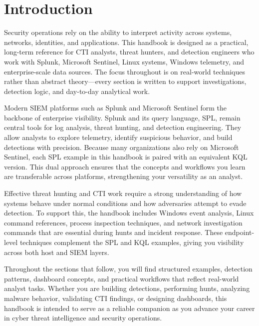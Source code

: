 \section{Introduction}

Security operations rely on the ability to interpret activity across systems, networks, identities, and applications. 
This handbook is designed as a practical, long-term reference for CTI analysts, threat hunters, and detection engineers 
who work with Splunk, Microsoft Sentinel, Linux systems, Windows telemetry, and enterprise-scale data sources. 
The focus throughout is on real-world techniques rather than abstract theory—every section is written to support 
investigations, detection logic, and day-to-day analytical work.

Modern SIEM platforms such as Splunk and Microsoft Sentinel form the backbone of enterprise visibility. 
Splunk and its query language, SPL, remain central tools for log analysis, threat hunting, and detection engineering. 
They allow analysts to explore telemetry, identify suspicious behavior, and build detections with precision. 
Because many organizations also rely on Microsoft Sentinel, each SPL example in this handbook is paired with an 
equivalent KQL version. This dual approach ensures that the concepts and workflows you learn are transferable 
across platforms, strengthening your versatility as an analyst.

Effective threat hunting and CTI work require a strong understanding of how systems behave under normal conditions 
and how adversaries attempt to evade detection. To support this, the handbook includes Windows event analysis, 
Linux command references, process inspection techniques, and network investigation commands that are essential 
during hunts and incident response. These endpoint-level techniques complement the SPL and KQL examples, giving 
you visibility across both host and SIEM layers.

Throughout the sections that follow, you will find structured examples, detection patterns, dashboard concepts, 
and practical workflows that reflect real-world analyst tasks. Whether you are building detections, performing hunts, 
analyzing malware behavior, validating CTI findings, or designing dashboards, this handbook is intended to serve as a 
reliable companion as you advance your career in cyber threat intelligence and security operations.
